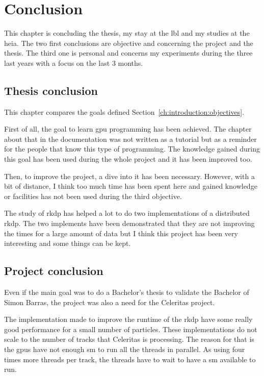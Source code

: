 \chapter{Conclusion}
\label{ch:conclusion}

This chapter is concluding the thesis, my stay at the \acrshort{lbl} and my
studies at the \acrshort{heia}.
The two first conclusions are objective and concerning the project and the thesis.
The third one is personal and concerns my experiments during the three last
years with a focus on the last 3 months.


\section{Thesis conclusion}
\label{ch:conclusion:thesis}

This chapter compares the goals defined Section~\ref{ch:introduction:objectives}.

First of all, the goal to learn \acrshort{gpu} programming has been achieved.
The chapter about that in the documentation was not written as a tutorial but
as a reminder for the people that know this type of programming.
The knowledge gained during this goal has been used during the whole project
and it has been improved too.

Then, to improve the project, a dive into it has been necessary.
However, with a bit of distance, I think too much time has been spent here and
gained knowledge or facilities has not been used during the third objective.

The study of \acrshort{rkdp} has helped a lot to do two implementations of a
distributed \acrshort{rkdp}.
The two implements have been demonstrated that they are not improving the times for
a large amount of data but I think this project has been very interesting and
some things can be kept.

\section{Project conclusion}
\label{ch:conclusion:project}

Even if the main goal was to do a Bachelor's thesis to validate the Bachelor of
Simon Barras, the project was also a need for the Celeritas project.

The implementation made to improve the runtime of the \acrshort{rkdp} have some
really good performance for a small number of particles.
These implementations do not scale to the number of tracks that Celeritas is processing.
The reason for that is the \acrshort{gpu}s have not enough \acrshort{sm} to run
all the threads in parallel.
As using four times more threads per track, the threads have to wait to have a
\acrshort{sm} available to run.

